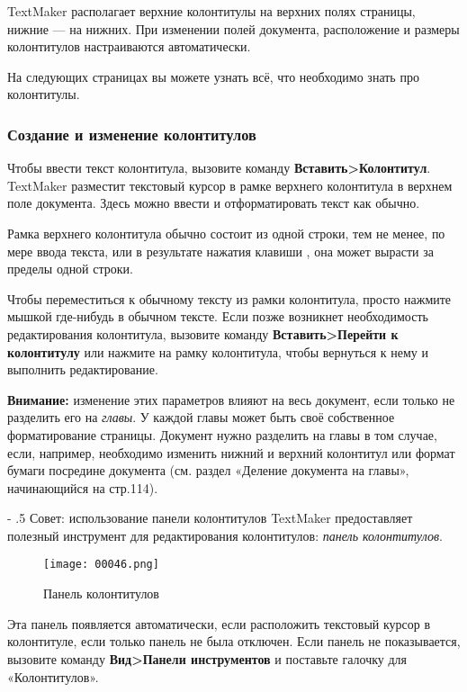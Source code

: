 \documentclass[a4paper,10pt]{article}
\makeatletter
\renewcommand\paragraph{%
   \@startsection{paragraph}{4}{0mm}%
      {-\baselineskip}%
      {.5\baselineskip}%
      {\normalfont\normalsize\bfseries}}
\makeatother
\begin{document}
TextMaker располагает верхние колонтитулы на верхних полях страницы, нижние --- на нижних. При изменении полей документа, расположение и размеры колонтитулов настраиваются автоматически.

На следующих страницах вы можете узнать всё, что необходимо знать про колонтитулы.

\subsubsection{Создание и изменение колонтитулов}
Чтобы ввести текст колонтитула, вызовите команду \textbf{Вставить>Колонтитул}. TextMaker разместит текстовый курсор в рамке верхнего колонтитула в верхнем поле документа. Здесь можно ввести и отформатировать текст как обычно.

Рамка верхнего колонтитула обычно состоит из одной строки, тем не менее, по мере ввода текста, или в результате нажатия клавиши , она может вырасти за пределы одной строки.

Чтобы переместиться к обычному тексту из рамки колонтитула, просто нажмите мышкой где-нибудь в обычном тексте. Если позже возникнет необходимость редактирования колонтитула, вызовите команду \textbf{Вставить>Перейти к колонтитулу} или нажмите на рамку колонтитула, чтобы вернуться к нему и выполнить редактирование.

\begin{mdframed}[backgroundcolor=blue!10]
\textbf{Внимание:} изменение этих параметров влияют на весь документ, если только не разделить его на \textit{главы}. У каждой главы может быть своё собственное форматирование страницы. Документ нужно разделить на главы в том случае, если, например, необходимо изменить нижний и верхний колонтитул или формат бумаги посредине документа (см. раздел «Деление документа на главы», начинающийся на стр.114).
\end{mdframed}

\paragraph{Совет: использование панели колонтитулов}
TextMaker предоставляет полезный инструмент для редактирования колонтитулов: \textit{панель колонтитулов}.

\begin{figure}[ht]
\texttt{[image: 00046.png]}
\centering
\caption{Панель колонтитулов}
\end{figure}

Эта панель появляется автоматически, если расположить текстовый курсор в колонтитуле, если только панель не была отключен. Если панель не показывается, вызовите команду \textbf{Вид>Панели инструментов} и поставьте галочку для «Колонтитулов».
\end{document}
